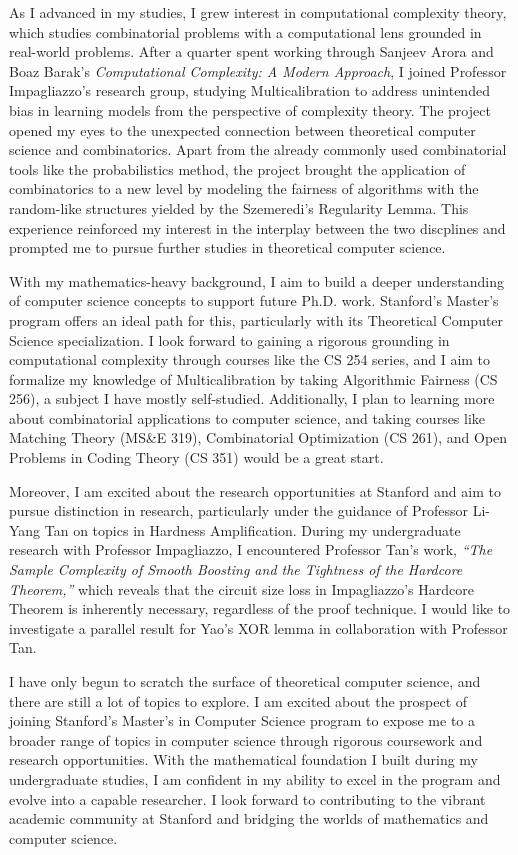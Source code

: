 \documentclass[12pt]{article}
\begin{document}
As I advanced in my studies, I grew interest in computational complexity theory, which studies
combinatorial problems with a computational lens grounded in real-world problems. After a quarter
spent working through Sanjeev Arora and Boaz Barak's \textit{Computational Complexity: A Modern
Approach}, I joined Professor Impagliazzo's research group, studying Multicalibration to address
unintended bias in learning models from the perspective of complexity theory. The project opened my
eyes to the unexpected connection between theoretical computer science and combinatorics. Apart from
the already commonly used combinatorial tools like the probabilistics method, the project brought
the application of combinatorics to a new level by modeling the fairness of algorithms with the
random-like structures yielded by the Szemeredi's Regularity Lemma. This experience reinforced my
interest in the interplay between the two discplines and prompted me to pursue further studies in
theoretical computer science.

With my mathematics-heavy background, I aim to build a deeper understanding of computer science
concepts to support future Ph.D. work. Stanford's Master's program offers an ideal path for this,
particularly with its Theoretical Computer Science specialization. I look forward to gaining a
rigorous grounding in computational complexity through courses like the CS 254 series, and I aim to
formalize my knowledge of Multicalibration by taking Algorithmic Fairness (CS 256), a subject I have
mostly self-studied. Additionally, I plan to learning more about combinatorial applications to
computer science, and taking courses like Matching Theory (MS\&E 319), Combinatorial Optimization
(CS 261), and Open Problems in Coding Theory (CS 351) would be a great start.

Moreover, I am excited about the research opportunities at Stanford and aim to pursue distinction in
research, particularly under the guidance of Professor Li-Yang Tan on topics in Hardness
Amplification. During my undergraduate research with Professor Impagliazzo, I encountered Professor
Tan's work,
\textit{``The Sample Complexity of Smooth Boosting and the Tightness of the Hardcore Theorem,''}
which reveals that the circuit size loss in Impagliazzo's Hardcore Theorem is inherently necessary,
regardless of the proof technique. I would like to investigate a parallel result for Yao's XOR lemma
in collaboration with Professor Tan.

I have only begun to scratch the surface of theoretical computer science, and there are still a lot
of topics to explore. I am excited about the prospect of joining Stanford's Master's in Computer
Science program to expose me to a broader range of topics in computer science through rigorous
coursework and research opportunities. With the mathematical foundation I built during my
undergraduate studies, I am confident in my ability to excel in the program and evolve into a
capable researcher. I look forward to contributing to the vibrant academic community at Stanford and
bridging the worlds of mathematics and computer science.
\end{document}
